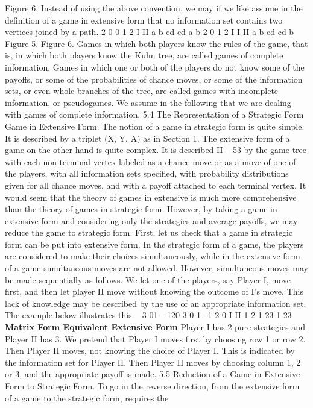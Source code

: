 Figure 6. Instead of using the above convention, we may if we like assume in the definition
of a game in extensive form that no information set contains two vertices joined by a path.
2 0
0 1
2
I
II
a b
cd cd
a b
2 0
1
2
I
I
II
a b
cd cd
b
Figure 5. Figure 6.
Games in which both players know the rules of the game, that is, in which both players
know the Kuhn tree, are called games of complete information. Games in which one or
both of the players do not know some of the payoffs, or some of the probabilities of chance
moves, or some of the information sets, or even whole branches of the tree, are called
games with incomplete information, or pseudogames. We assume in the following
that we are dealing with games of complete information.
5.4 The Representation of a Strategic Form Game in Extensive Form. The
notion of a game in strategic form is quite simple. It is described by a triplet (X, Y, A) as in
Section 1. The extensive form of a game on the other hand is quite complex. It is described
II – 53
by the game tree with each non-terminal vertex labeled as a chance move or as a move
of one of the players, with all information sets specified, with probability distributions
given for all chance moves, and with a payoff attached to each terminal vertex. It would
seem that the theory of games in extensive is much more comprehensive than the theory
of games in strategic form. However, by taking a game in extensive form and considering
only the strategies and average payoffs, we may reduce the game to strategic form.
First, let us check that a game in strategic form can be put into extensive form. In the
strategic form of a game, the players are considered to make their choices simultaneously,
while in the extensive form of a game simultaneous moves are not allowed. However,
simultaneous moves may be made sequentially as follows. We let one of the players, say
Player I, move first, and then let player II move without knowing the outcome of I’s move.
This lack of knowledge may be described by the use of an appropriate information set.
The example below illustrates this.
 3 01
−120
3 0 1 –1 2 0
I
II
1 2
1 23 1 23
\noindent \textbf{Matrix Form Equivalent Extensive Form}
Player I has 2 pure strategies and Player II has 3. We pretend that Player I moves first by
choosing row 1 or row 2. Then Player II moves, not knowing the choice of Player I. This is
indicated by the information set for Player II. Then Player II moves by choosing column
1, 2 or 3, and the appropriate payoff is made.
5.5 Reduction of a Game in Extensive Form to Strategic Form. To go in
the reverse direction, from the extensive form of a game to the strategic form, requires the
